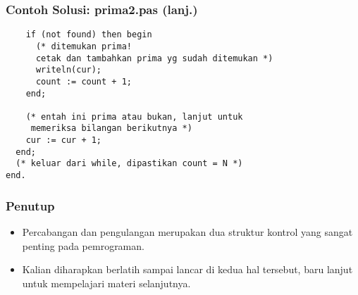 \documentclass{beamer}
\begin{document}
\begin{frame}[fragile]
\frametitle{Contoh Solusi: prima2.pas (lanj.)}
\begin{lstlisting}
    if (not found) then begin
      (* ditemukan prima!
      cetak dan tambahkan prima yg sudah ditemukan *)
      writeln(cur);
      count := count + 1;
    end;

    (* entah ini prima atau bukan, lanjut untuk
     memeriksa bilangan berikutnya *)
    cur := cur + 1;
  end;
  (* keluar dari while, dipastikan count = N *)
end.
\end{lstlisting}
\end{frame}

\begin{frame}
\frametitle{Penutup}
\begin{itemize}
  \item Percabangan dan pengulangan merupakan dua struktur kontrol yang sangat penting pada pemrograman.
  \item Kalian diharapkan berlatih sampai lancar di kedua hal tersebut, baru lanjut untuk mempelajari materi selanjutnya.
\end{itemize}
\end{frame}
\end{document}
